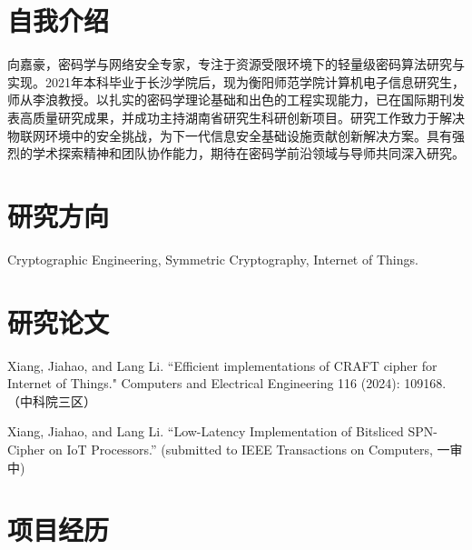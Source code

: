 \documentclass[11pt,a4paper,sans]{moderncv}
\begin{document}
\renewcommand*{\footrulewidth}{0pt}
\cfoot{}
\rfoot{\today}

\makecvtitle

\section{自我介绍}
向嘉豪，密码学与网络安全专家，专注于资源受限环境下的轻量级密码算法研究与实现。2021年本科毕业于长沙学院后，现为衡阳师范学院计算机电子信息研究生，师从李浪教授。以扎实的密码学理论基础和出色的工程实现能力，已在国际期刊发表高质量研究成果，并成功主持湖南省研究生科研创新项目。研究工作致力于解决物联网环境中的安全挑战，为下一代信息安全基础设施贡献创新解决方案。具有强烈的学术探索精神和团队协作能力，期待在密码学前沿领域与导师共同深入研究。

\section{研究方向}
Cryptographic Engineering, Symmetric Cryptography, Internet of Things.

\section{研究论文}
Xiang, Jiahao, and Lang Li. ``Efficient implementations of CRAFT cipher for Internet of Things." Computers and Electrical Engineering 116 (2024): 109168. （中科院三区）

Xiang, Jiahao, and Lang Li. ``Low-Latency Implementation of Bitsliced SPN-Cipher on IoT Processors.'' (submitted to IEEE Transactions on Computers, 一审中)

\section{项目经历}
\end{document}
